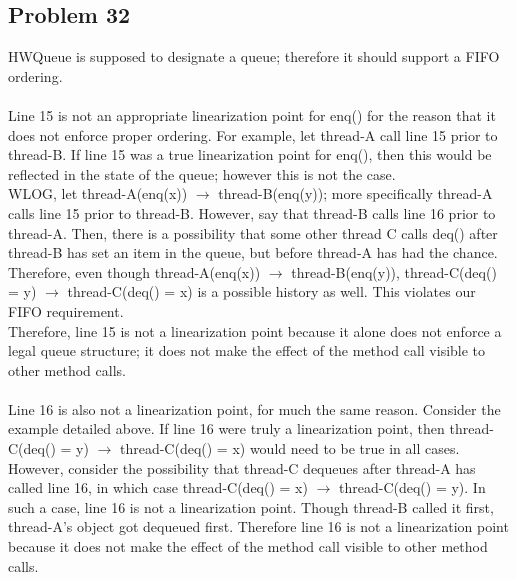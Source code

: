 \documentclass[]{article}
\begin{document}
\subsection{Problem 32}
HWQueue is supposed to designate a queue; therefore it should support a FIFO ordering.
\\\\
Line 15 is not an appropriate linearization point for enq() for the reason that it does not enforce proper ordering. For example, let thread-A call line 15 prior to thread-B. If line 15 was a true linearization point for enq(), then this would be reflected in the state of the queue; however this is not the case.
\\
WLOG, let thread-A(enq(x)) $\rightarrow$ thread-B(enq(y)); more specifically thread-A calls line 15 prior to thread-B. However, say that thread-B calls line 16 prior to thread-A. Then, there is a possibility that some other thread C calls deq() after thread-B has set an item in the queue, but before thread-A has had the chance. Therefore, even though thread-A(enq(x)) $\rightarrow$ thread-B(enq(y)), thread-C(deq() = y) $\rightarrow$ thread-C(deq() = x) is a possible history as well. This violates our FIFO requirement.
\\
Therefore, line 15 is not a linearization point because it alone does not enforce a legal queue structure; it does not make the effect of the method call visible to other method calls.
\\\\
Line 16 is also not a linearization point, for much the same reason. Consider the example detailed above. If line 16 were truly a linearization point, then thread-C(deq() = y) $\rightarrow$ thread-C(deq() = x) would need to be true in all cases. However, consider the possibility that thread-C dequeues after thread-A has called line 16, in which case thread-C(deq() = x) $\rightarrow$ thread-C(deq() = y). In such a case, line 16 is not a linearization point. Though thread-B called it first, thread-A's object got dequeued first. Therefore line 16 is not a linearization point because it does not make the effect of the method call visible to other method calls.


	
	
\end{document}
